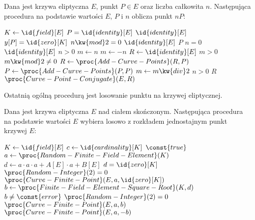 \begin{algorithm}
Dana jest krzywa eliptyczna $E$,
punkt $P \in E$ oraz liczba całkowita $n$.
Następująca procedura
na podstawie wartości $E$, $P$ i $n$
oblicza
punkt $nP$:

\begin{codebox}
\li
    $K \gets \id{field}[E]$
\li
    \If $P = \id{identity}[E]$
\li
        \Then
            \Return $\id{identity}[E]$
        \End
\li
    \If $y[P] = \id{zero}[K]$
\li
        \Then
            \If $n \kw{ mod } 2 = 0$
\li
                \Then
                    \Return $\id{identity}[E]$
\li
                \Else
                    \Return $P$
                \End
        \End
\li
    \If $n = 0$
\li
        \Then
            \Return $\id{identity}[E]$
        \End
\li
    \If $n > 0$
\li
        \Then
            $m \gets n$
\li
        \Else
            $m \gets -n$
        \End
\li
    $R \gets \id{identity}[E]$
\li
    \While $m > 0$
\li
        \Do
            \If $m \kw{ mod } 2 \neq 0$
\li
                \Then
                    $R \gets \proc{Add-Curve-Points}(R, P)$
                \End
\li
            $P \gets \proc{Add-Curve-Points}(P, P)$
\li
            $m \gets m \kw{ div } 2$
        \End
\li
    \If $n > 0$
\li
        \Then
            \Return $R$
\li
        \Else
            \Return $\proc{Curve-Point-Conjugate}(E, R)$
        \End
\end{codebox}
\end{algorithm}

Ostatnią ogólną procedurą jest losowanie punktu na krzywej eliptycznej.

\begin{algorithm}
Dana jest krzywa eliptyczna $E$ nad ciałem skończonym.
Następująca procedura
na podstawie wartości $E$
wybiera losowo z rozkładem jednostajnym
punkt krzywej $E$:

\begin{codebox}
\li
    $K \gets \id{field}[E]$
\li
    $c \gets \id{cardinality}[K]$
\li
    \While $\const{true}$
\li
        \Do
            $a \gets \proc{Random-Finite-Field-Element}(K)$
\li
            $d \gets a \cdot a \cdot a + A[E] \cdot a + B[E]$
\li
            \If $d = \id{zero}[K]$
\li
                \Then
                    \If $\proc{Random-Integer}(2) = 0$
\li
                        \Then
                                    \Return $\proc{Curve-Finite-Point}(E, a, \id{zero}[K])$
                        \End
\li
                \Else
                    $b \gets \proc{Finite-Field-Element-Square-Root}(K, d)$
\li
                    \If $b \neq \const{error}$
\li
                        \Then
                            \If $\proc{Random-Integer}(2) = 0$
\li
                                \Then
                                    \Return $\proc{Curve-Finite-Point}(E, a, b)$
\li
                                \Else
                                    \Return $\proc{Curve-Finite-Point}(E, a, -b)$
                                \End
                        \End
                \End
        \End
\end{codebox}
\end{algorithm}

